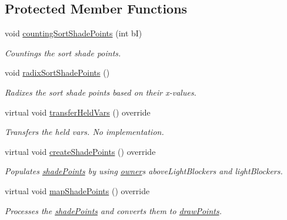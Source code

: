 \subsection*{Protected Member Functions}
\begin{DoxyCompactItemize}
\item 
void \hyperlink{classlighting_1_1AboveLightSource_a40e7b34c807c7c91ff6889551a89ec88}{counting\+Sort\+Shade\+Points} (int bI)
\begin{DoxyCompactList}\small\item\em Countings the sort shade points. \end{DoxyCompactList}\item 
void \hyperlink{classlighting_1_1AboveLightSource_af874db3015b41b546bcc178d0904572a}{radix\+Sort\+Shade\+Points} ()
\begin{DoxyCompactList}\small\item\em Radixes the sort shade points based on their x-\/values. \end{DoxyCompactList}\item 
virtual void \hyperlink{classlighting_1_1AboveLightSource_a4b18ea492b7f63bc34f7bd269317c20e}{transfer\+Held\+Vars} () override
\begin{DoxyCompactList}\small\item\em Transfers the held vars. No implementation. \end{DoxyCompactList}\item 
virtual void \hyperlink{classlighting_1_1AboveLightSource_a13665ac64b61239624b430a49ab609ab}{create\+Shade\+Points} () override
\begin{DoxyCompactList}\small\item\em Populates \hyperlink{classlighting_1_1AboveLightSource_a255e98bb6aae0099178cb7aa2d9671a5}{shade\+Points} by using \hyperlink{classlighting_1_1LightSource_ab991aac9d9ab3a1583f4acdc209055d5}{owner}\textquotesingle{}s above\+Light\+Blockers and light\+Blockers. \end{DoxyCompactList}\item 
virtual void \hyperlink{classlighting_1_1AboveLightSource_a9331dd2674565685388ef044b71a4881}{map\+Shade\+Points} () override
\begin{DoxyCompactList}\small\item\em Processes the \hyperlink{classlighting_1_1AboveLightSource_a255e98bb6aae0099178cb7aa2d9671a5}{shade\+Points} and converts them to \hyperlink{classlighting_1_1AboveLightSource_a225b94f0f210561668b94e412c66443b}{draw\+Points}. \end{DoxyCompactList}\item 

\end{DoxyCompactItemize}
